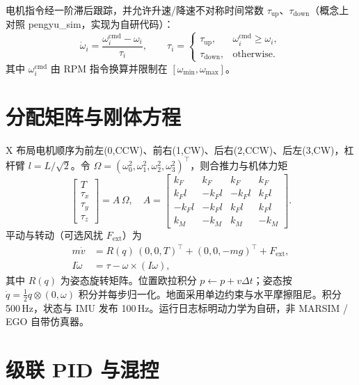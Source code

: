 电机指令经一阶滞后跟踪，并允许升速/降速不对称时间常数 $\tau_{\mathrm{up}}$、$\tau_{\mathrm{down}}$（概念上对照 pengyu\_sim，实现为自研代码）：
\begin{equation}
  \dot{\omega}_i = \frac{\omega_i^{\mathrm{cmd}}-\omega_i}{\tau_i},\qquad
  \tau_i=
  \begin{cases}
  \tau_{\mathrm{up}}, & \omega_i^{\mathrm{cmd}}\ge\omega_i,\\
  \tau_{\mathrm{down}}, & \text{otherwise.}
  \end{cases}
\end{equation}
其中 $\omega_i^{\mathrm{cmd}}$ 由 RPM 指令换算并限制在 $[\omega_{\min},\omega_{\max}]$。

\section{分配矩阵与刚体方程}

X 布局电机顺序为前左(0,CCW)、前右(1,CW)、后右(2,CCW)、后左(3,CW)，杠杆臂 $l=L/\sqrt{2}$。令 $\Omega=(\omega_0^2,\omega_1^2,\omega_2^2,\omega_3^2)^\top$，则合推力与机体力矩
\begin{equation}
  \begin{bmatrix} T\\ \tau_x\\ \tau_y\\ \tau_z \end{bmatrix}
  = A\,\Omega,
  \quad
  A=
  \begin{bmatrix}
  k_F & k_F & k_F & k_F \\
  k_F l & -k_F l & -k_F l & k_F l \\
  -k_F l & -k_F l & k_F l & k_F l \\
  k_M & -k_M & k_M & -k_M
  \end{bmatrix}.
\end{equation}
平动与转动（可选风扰 $F_{\mathrm{ext}}$）为
\begin{align}
  m\dot{v} &= R(q)\,(0,0,T)^\top + (0,0,-mg)^\top + F_{\mathrm{ext}}, \\
  I\dot{\omega} &= \tau - \omega\times(I\omega),
\end{align}
其中 $R(q)$ 为姿态旋转矩阵。位置欧拉积分 $p\leftarrow p+v\Delta t$；姿态按 $\dot{q}=\tfrac12 q\otimes(0,\omega)$ 积分并每步归一化。地面采用单边约束与水平摩擦阻尼。积分 500\,Hz，状态与 IMU 发布 100\,Hz。运行日志标明动力学为自研，非 MARSIM / EGO 自带仿真器。

\section{级联 PID 与混控}

